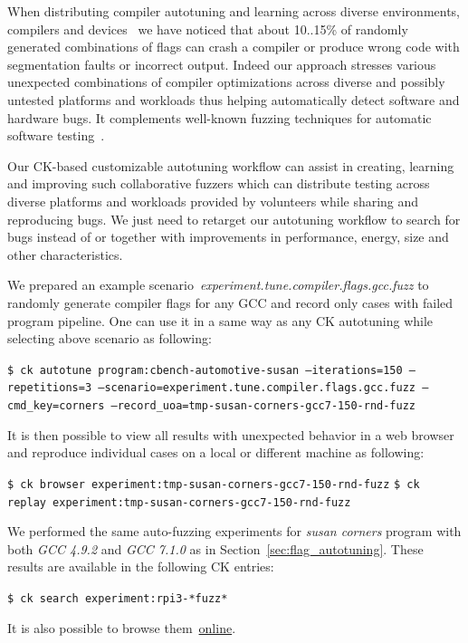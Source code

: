 When distributing compiler autotuning and learning across diverse environments, 
compilers and devices~\cite{Fur2009,cm:29db2248aba45e59:cd11e3a188574d80} 
we have noticed that about 10..15\% of randomly generated combinations 
of flags can crash a compiler or produce wrong code with segmentation faults
or incorrect output.
%
Indeed our approach stresses various unexpected combinations 
of compiler optimizations across diverse and possibly untested platforms and workloads
thus helping automatically detect software and hardware bugs.
%
It complements well-known fuzzing techniques for automatic software 
testing~\cite{Duran:1981:RRT:800078.802530,Takanen:2008:FSS:1404500,Yang:2011:FUB:1993498.1993532}.

Our CK-based customizable autotuning workflow can assist in creating, 
learning and improving such collaborative fuzzers 
which can distribute testing across diverse platforms and workloads 
provided by volunteers while sharing and reproducing bugs.
%
We just need to retarget our autotuning workflow to search for
bugs instead of or together with improvements in performance, 
energy, size and other characteristics.

We prepared an example scenario~\emph{experiment.tune.compiler.flags.gcc.fuzz}
to randomly generate compiler flags for any GCC and record only cases
with failed program pipeline.
%
One can use it in a same way as any CK autotuning while selecting 
above scenario as following:

\begin{flushleft}
\texttt{\$ ck autotune program:cbench-automotive-susan --iterations=150 --repetitions=3 
  --scenario=experiment.tune.compiler.flags.gcc.fuzz
  --cmd\_key=corners --record\_uoa=tmp-susan-corners-gcc7-150-rnd-fuzz}
\end{flushleft}

It is then possible to view all results with unexpected behavior 
in a web browser and reproduce individual cases 
on a local or different machine as following: 

\begin{flushleft}
\texttt{\$ ck browser experiment:tmp-susan-corners-gcc7-150-rnd-fuzz}
\texttt{\$ ck replay experiment:tmp-susan-corners-gcc7-150-rnd-fuzz}
\end{flushleft}

We performed the same auto-fuzzing experiments for \textit{susan corners} program 
with both \textit{GCC 4.9.2} and \textit{GCC 7.1.0} as in Section~\ref{sec:flag_autotuning}.
%
These results are available in the following CK entries:
\begin{flushleft}
\texttt{\$ ck search experiment:rpi3-*fuzz*}
\end{flushleft}
%
It is also possible to browse them~\href{http://cknowledge.org/repo/web.php?wcid=experiment:rpi3-*fuzz*}{online}.

